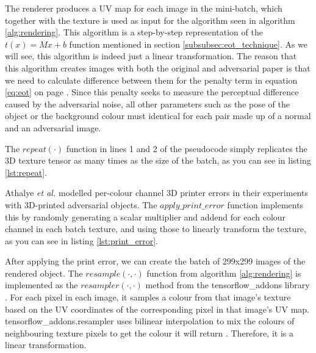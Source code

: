 The renderer produces a UV map for each image in the mini-batch, which together with the texture is used as input for the algorithm seen in algorithm \ref{alg:rendering}. This algorithm is a step-by-step representation of the $t(x) = Mx + b$ function mentioned in section \ref{subsubsec:eot_technique}. As we will see, this algorithm is indeed just a linear transformation. The reason that this algorithm creates images with both the original and adversarial paper is that we need to calculate difference between them for the penalty term in equation \ref{eq:eot} on page \pageref{eq:eot}. Since this penalty seeks to measure the perceptual difference caused by the adversarial noise, all other parameters such as the pose of the object or the background colour must identical for each pair made up of a normal and an adversarial image.

The $repeat(\cdot)$ function in lines 1 and 2 of the pseudocode simply replicates the 3D texture tensor as many times as the size of the batch, as you can see in listing \ref{lst:repeat}.





Athalye \textit{et al.} \cite{athalye} modelled per-colour channel 3D printer errors in their experiments with 3D-printed adversarial objects. The $apply\_print\_error$ function implements this by randomly generating a scalar multiplier and addend for each colour channel in each batch texture, and using those to linearly transform the texture, as you can see in listing \ref{lst:print_error}.

After applying the print error, we can create the batch of 299x299 images of the rendered object. The $resample(\cdot, \cdot)$ function from algorithm \ref{alg:rendering} is implemented as the $resampler(\cdot, \cdot)$ method from the tensorflow\_addons library \cite{tfa_resampler}. For each pixel in each image, it samples a colour from that image's texture based on the UV coordinates of the corresponding pixel in that image's UV map. tensorflow\_addons.resampler uses bilinear interpolation to mix the colours of neighbouring texture pixels to get the colour it will return \cite{tfa_resampler}. Therefore, it is a linear transformation.

